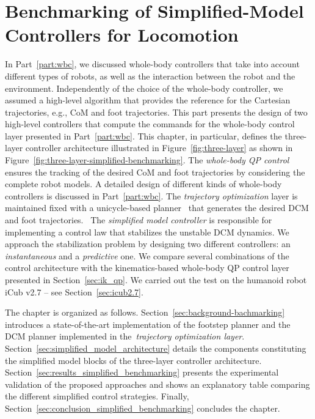 \chapter{Benchmarking of Simplified-Model Controllers for Locomotion\label{chapter:simplified_benchmarking}}

In Part~\ref{part:wbc}, we discussed whole-body controllers that take into account different types of robots, as well as the interaction between the robot and the environment. Independently of the choice of the whole-body controller, we assumed a high-level algorithm that provides the reference for the Cartesian trajectories, e.g., CoM and foot trajectories. This part presents the design of two high-level controllers that compute the commands for the whole-body control layer presented in Part~\ref{part:wbc}. This chapter, in particular, defines the three-layer controller architecture illustrated in Figure~\ref{fig:three-layer} as shown in Figure~\ref{fig:three-layer-simplified-benchmarking}.
The \emph{whole-body QP control} ensures the tracking of the desired CoM and foot trajectories by considering the complete robot models. A detailed design of different kinds of whole-body controllers is discussed in Part~\ref{part:wbc}.
The \emph{trajectory optimization} layer is maintained fixed with a unicycle-based planner~\citep{8594277} that generates the desired DCM and foot trajectories. 
The \emph{simplified model controller} is responsible for implementing a control law that stabilizes the unstable DCM dynamics. We approach the stabilization problem by designing two different controllers: an \emph{instantaneous} and a \emph{predictive} one.
We compare several combinations of the control architecture with the kinematics-based whole-body QP control layer presented in Section~\ref{sec:ik_qp}.
We carried out the test on the humanoid robot iCub v2.7 -- see Section~\ref{sec:icub2.7}.
\par
The chapter is organized as follows. Section~\ref{sec:background-bachmarking} introduces a state-of-the-art implementation of the footstep planner and the DCM planner implemented in the~\emph{trajectory optimization layer}. Section~\ref{sec:simplified_model_architecture} details the components constituting the simplified model blocks of the three-layer controller architecture. Section~\ref{sec:results_simplified_benchmarking} presents the experimental validation of the proposed approaches and shows an explanatory table comparing the different simplified control strategies. Finally, Section~\ref{sec:conclusion_simplified_benchmarking} concludes the chapter.
